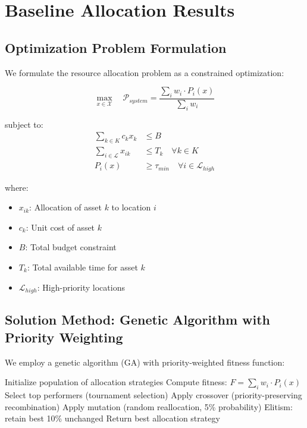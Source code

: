 \section{Baseline Allocation Results}

\subsection{Optimization Problem Formulation}

We formulate the resource allocation problem as a constrained optimization:

\begin{equation}
\max_{x \in \mathcal{X}} \quad \mathcal{P}_{system} = \frac{\sum_{i} w_i \cdot P_i(x)}{\sum_{i} w_i}
\label{eq:optimization_obj}
\end{equation}

subject to:
\begin{align}
\sum_{k \in K} c_k x_k &\leq B \label{eq:budget_constraint} \\
\sum_{i \in \mathcal{L}} x_{ik} &\leq T_k \quad \forall k \in K \label{eq:time_constraint} \\
P_i(x) &\geq \tau_{min} \quad \forall i \in \mathcal{L}_{high} \label{eq:min_protection}
\end{align}

where:
\begin{itemize}
\item $x_{ik}$: Allocation of asset $k$ to location $i$
\item $c_k$: Unit cost of asset $k$
\item $B$: Total budget constraint
\item $T_k$: Total available time for asset $k$
\item $\mathcal{L}_{high}$: High-priority locations
\end{itemize}

\subsection{Solution Method: Genetic Algorithm with Priority Weighting}

We employ a genetic algorithm (GA) with priority-weighted fitness function:

\begin{algorithm}[H]
\caption{Priority-Weighted Allocation GA}
\begin{algorithmic}[1]
\STATE Initialize population of allocation strategies
        \STATE Compute fitness: $F = \sum_i w_i \cdot P_i(x)$
    \ENDFOR
    \STATE Select top performers (tournament selection)
    \STATE Apply crossover (priority-preserving recombination)
    \STATE Apply mutation (random reallocation, 5\% probability)
    \STATE Elitism: retain best 10\% unchanged
\ENDFOR
\STATE Return best allocation strategy
\end{algorithmic}
\end{algorithm}

